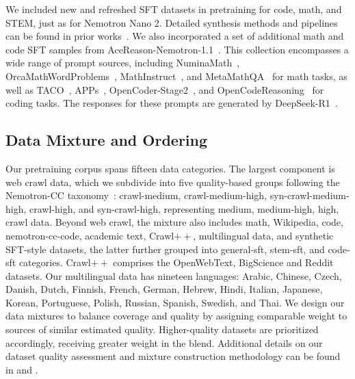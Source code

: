 We included new and refreshed SFT datasets in pretraining for code, math, and STEM, just as for Nemotron Nano 2. Detailed synthesis methods and pipelines can be found in prior works~\citep{toshniwal2024openmathinstruct, moshkov2025aimo2,bercovich2025llamanemotronefficientreasoningmodels,ahmad2025opencodereasoning,ahmad2025opencodeinstruct,majumdar2024genetic}.
We also incorporated a set of additional math and code SFT samples from AceReason-Nemotron-1.1~\citep{liu2025acereason}. This collection encompasses a wide range of prompt sources, including NuminaMath~\citep{numina_math_datasets}, OrcaMathWordProblems~\citep{mitra2024orca}, MathInstruct~\citep{yue2023mammoth}, and MetaMathQA~\citep{yu2023metamath} for math tasks, as well as TACO~\citep{li2023taco}, APPs~\citep{hendrycksapps2021}, OpenCoder-Stage2~\citep{Huang2024OpenCoderTO}, and OpenCodeReasoning~\citep{ahmad2025opencodereasoning} for coding tasks. The responses for these prompts are generated by DeepSeek-R1~\citep{deepseekai2025deepseekr1incentivizingreasoningcapability}.


\subsection{Data Mixture and Ordering}
\label{section:blend}

Our pretraining corpus spans fifteen data categories.
The largest component is web crawl data, which we subdivide into five quality-based groups following the Nemotron-CC taxonomy~\citep{su2024nemotroncctransformingcommoncrawl}: crawl-medium, crawl-medium-high, syn-crawl-medium-high, crawl-high, and syn-crawl-high, representing medium, medium-high, high,  crawl data.
Beyond web crawl, the mixture also includes math, Wikipedia, code, nemotron-cc-code, academic text, Crawl$++$, multilingual data, and synthetic SFT-style datasets, the latter further grouped into general-sft, stem-sft, and code-sft categories.
Crawl$++$ comprises the OpenWebText, BigScience and Reddit datasets. 
Our multilingual data has nineteen languages:
Arabic, Chinese, Czech, Danish, Dutch, Finnish, French, German, Hebrew, Hindi, Italian, Japanese, Korean, Portuguese, Polish, Russian, Spanish, Swedish, and Thai. 
We design our data mixtures to balance coverage and quality by assigning comparable weight to sources of similar estimated quality. Higher-quality datasets are prioritized accordingly, receiving greater weight in the blend. Additional details on our dataset quality assessment and mixture construction methodology can be found in \cite{feng2024maximizedataspotentialenhancing} and \cite{nvidia2025nemotronhfamilyaccurateefficient}.


